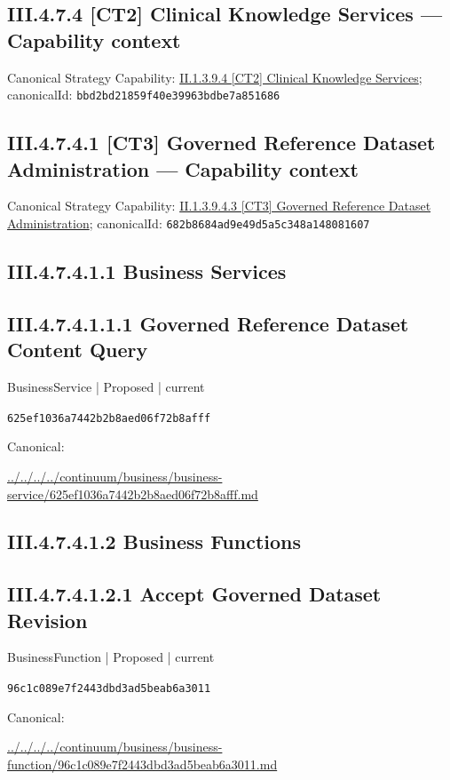 \documentclass[10pt,a4paper]{article}
\begin{document}
\subsection*{III.4.7.4 [CT2] Clinical Knowledge Services — Capability context}
Canonical Strategy Capability: \hyperref[element-bbd2bd21859f40e39963bdbe7a851686]{II.1.3.9.4 [CT2] Clinical Knowledge Services}; canonicalId: \texttt{bbd2bd21859f40e39963bdbe7a851686}\par
\subsection*{III.4.7.4.1 [CT3] Governed Reference Dataset Administration — Capability context}
Canonical Strategy Capability: \hyperref[element-682b8684ad9e49d5a5c348a148081607]{II.1.3.9.4.3 [CT3] Governed Reference Dataset Administration}; canonicalId: \texttt{682b8684ad9e49d5a5c348a148081607}\par
\subsection*{III.4.7.4.1.1 Business Services}
\subsection*{III.4.7.4.1.1.1 Governed Reference Dataset Content Query}
\label{element-625ef1036a7442b2b8aed06f72b8afff}
{\small BusinessService | Proposed | current}\par
\texttt{625ef1036a7442b2b8aed06f72b8afff}\par
Canonical: \par
{\footnotesize\url{../../../../continuum/business/business-service/625ef1036a7442b2b8aed06f72b8afff.md}}\par
\subsection*{III.4.7.4.1.2 Business Functions}
\subsection*{III.4.7.4.1.2.1 Accept Governed Dataset Revision}
\label{element-96c1c089e7f2443dbd3ad5beab6a3011}
{\small BusinessFunction | Proposed | current}\par
\texttt{96c1c089e7f2443dbd3ad5beab6a3011}\par
Canonical: \par
{\footnotesize\url{../../../../continuum/business/business-function/96c1c089e7f2443dbd3ad5beab6a3011.md}}\par
\end{document}
